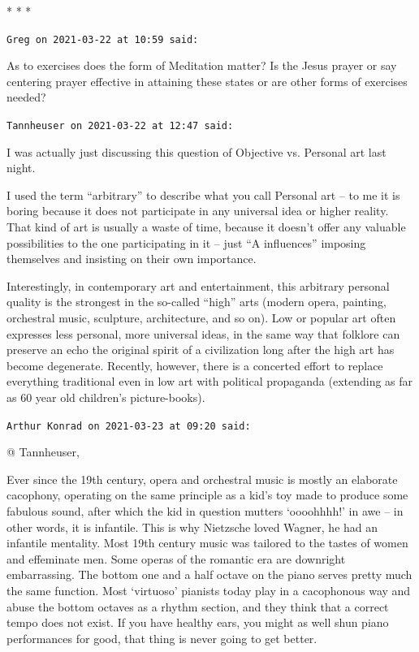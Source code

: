 \begin{center}* * *\end{center}

\begin{footnotesize}\begin{sffamily}



\texttt{Greg on 2021-03-22 at 10:59 said: }

As to exercises does the form of Meditation matter? Is the Jesus prayer or say centering prayer effective in attaining these states or are other forms of exercises needed?


\hfill

\texttt{Tannheuser on 2021-03-22 at 12:47 said: }

I was actually just discussing this question of Objective vs. Personal art last night. 

I used the term “arbitrary” to describe what you call Personal art – to me it is boring because it does not participate in any universal idea or higher reality. That kind of art is usually a waste of time, because it doesn't offer any valuable possibilities to the one participating in it – just “A influences” imposing themselves and insisting on their own importance.

Interestingly, in contemporary art and entertainment, this arbitrary personal quality is the strongest in the so-called “high” arts (modern opera, painting, orchestral music, sculpture, architecture, and so on). Low or popular art often expresses less personal, more universal ideas, in the same way that folklore can preserve an echo the original spirit of a civilization long after the high art has become degenerate. Recently, however, there is a concerted effort to replace everything traditional even in low art with political propaganda (extending as far as 60 year old children's picture-books).


\hfill

\texttt{Arthur Konrad on 2021-03-23 at 09:20 said: }

@ Tannheuser,

Ever since the 19th century, opera and orchestral music is mostly an elaborate cacophony, operating on the same principle as a kid's toy made to produce some fabulous sound, after which the kid in question mutters `oooohhhh!' in awe – in other words, it is infantile. This is why Nietzsche loved Wagner, he had an infantile mentality. Most 19th century music was tailored to the tastes of women and effeminate men. Some operas of the romantic era are downright embarrassing. The bottom one and a half octave on the piano serves pretty much the same function. Most `virtuoso' pianists today play in a cacophonous way and abuse the bottom octaves as a rhythm section, and they think that a correct tempo does not exist. If you have healthy ears, you might as well shun piano performances for good, that thing is never going to get better.


\end{sffamily}
\end{footnotesize}
